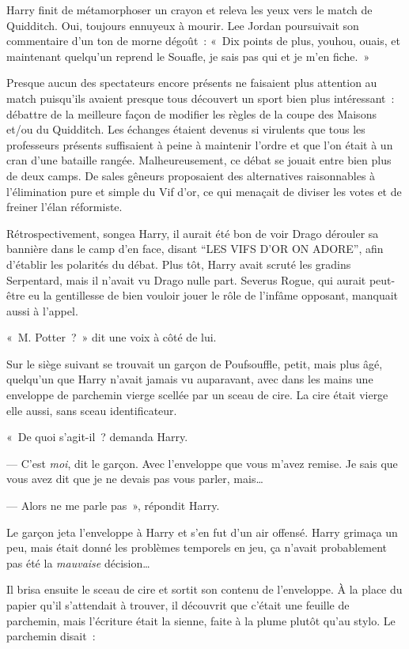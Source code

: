 Harry finit de métamorphoser un crayon et releva les yeux vers le match de Quidditch. Oui, toujours ennuyeux à mourir. Lee Jordan poursuivait son commentaire d'un ton de morne dégoût~: «~Dix points de plus, youhou, ouais, et maintenant quelqu'un reprend le Souafle, je sais pas qui et je m'en fiche.~»

Presque aucun des spectateurs encore présents ne faisaient plus attention au match puisqu'ils avaient presque tous découvert un sport bien plus intéressant~: débattre de la meilleure façon de modifier les règles de la coupe des Maisons et/ou du Quidditch. Les échanges étaient devenus si virulents que tous les professeurs présents suffisaient à peine à maintenir l'ordre et que l'on était à un cran d'une bataille rangée. Malheureusement, ce débat se jouait entre bien plus de deux camps. De sales gêneurs proposaient des alternatives raisonnables à l'élimination pure et simple du Vif d'or, ce qui menaçait de diviser les votes et de freiner l'élan réformiste.

Rétrospectivement, songea Harry, il aurait été bon de voir Drago dérouler sa bannière dans le camp d'en face, disant “LES VIFS D'OR ON ADORE”, afin d'établir les polarités du débat. Plus tôt, Harry avait scruté les gradins Serpentard, mais il n'avait vu Drago nulle part. Severus Rogue, qui aurait peut-être eu la gentillesse de bien vouloir jouer le rôle de l'infâme opposant, manquait aussi à l'appel.

«~M. Potter~?~» dit une voix à côté de lui.

Sur le siège suivant se trouvait un garçon de Poufsouffle, petit, mais plus âgé, quelqu'un que Harry n'avait jamais vu auparavant, avec dans les mains une enveloppe de parchemin vierge scellée par un sceau de cire. La cire était vierge elle aussi, sans sceau identificateur.

«~De quoi s'agit-il~? demanda Harry.

--- C'est \emph{moi}, dit le garçon. Avec l'enveloppe que vous m'avez remise. Je sais que vous avez dit que je ne devais pas vous parler, mais…

--- Alors ne me parle pas~», répondit Harry.

Le garçon jeta l'enveloppe à Harry et s'en fut d'un air offensé. Harry grimaça un peu, mais était donné les problèmes temporels en jeu, ça n'avait probablement pas été la \emph{mauvaise} décision…

Il brisa ensuite le sceau de cire et sortit son contenu de l'enveloppe. À la place du papier qu'il s'attendait à trouver, il découvrit que c'était une feuille de parchemin, mais l'écriture était la sienne, faite à la plume plutôt qu'au stylo. Le parchemin disait~:

